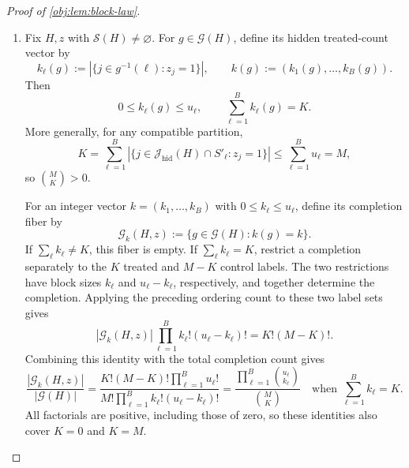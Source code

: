 \documentclass[11pt]{article}
\begin{document}
\begin{proof}[Proof of \cref{obj:lem:block-law}]
\begin{enumerate}
Define the hidden-label completion space by
\[
\mathcal G(H):=
\left\{g:\mathcal J_{\mathrm{hid}}(H)\to\{1,\ldots,B\}:
|g^{-1}(\ell)|=u_\ell\ \text{for every }\ell\right\}.
\]
Restriction to hidden labels and extension by the revealed labels give inverse maps
\[
\mathcal S(H)\longleftrightarrow\mathcal G(H),
\qquad
S'_\ell=\mathcal R_\ell(H)\cup g^{-1}(\ell).
\]
Count completions by ordering all \(M\) hidden labels and cutting the ordering into blocks of lengths \(u_1,\ldots,u_B\). Each completion arises from exactly \(\prod_\ell u_\ell!\) such orderings, because labels may be reordered within each block. Therefore
\[
|\mathcal G(H)|\prod_{\ell=1}^{B}u_\ell!=M!,
\qquad
\frac1{|\mathcal G(H)|}
=\frac{\prod_{\ell=1}^{B}u_\ell!}{M!}.
\]
The uniform compatible-partition average is consequently the same as the uniform hidden-label completion average. This identity includes \(M=0\), with \(0!=1\). For graphs with \(\mathcal S(H)=\varnothing\), the completion record measure is defined to be zero, as in the preceding step. %

\item Fix \(H,z\) with \(\mathcal S(H)\ne\varnothing\). For \(g\in\mathcal G(H)\), define its hidden treated-count vector by
\[
k_\ell(g):=|\{j\in g^{-1}(\ell):z_j=1\}|,
\qquad
k(g):=(k_1(g),\ldots,k_B(g)).
\]
Then
\[
0\le k_\ell(g)\le u_\ell,
\qquad
\sum_{\ell=1}^{B}k_\ell(g)=K.
\]
More generally, for any compatible partition,
\[
K
=\sum_{\ell=1}^{B}
|\{j\in\mathcal J_{\mathrm{hid}}(H)\cap S'_\ell:z_j=1\}|
\le\sum_{\ell=1}^{B}u_\ell=M,
\]
so \(\binom{M}{K}>0\).

For an integer vector \(k=(k_1,\ldots,k_B)\) with \(0\le k_\ell\le u_\ell\), define its completion fiber by
\[
\mathcal G_k(H,z):=\{g\in\mathcal G(H):k(g)=k\}.
\]
If \(\sum_\ell k_\ell\ne K\), this fiber is empty. If \(\sum_\ell k_\ell=K\), restrict a completion separately to the \(K\) treated and \(M-K\) control labels. The two restrictions have block sizes \(k_\ell\) and \(u_\ell-k_\ell\), respectively, and together determine the completion. Applying the preceding ordering count to these two label sets gives
\[
|\mathcal G_k(H,z)|
\prod_{\ell=1}^{B}k_\ell!(u_\ell-k_\ell)!
=K!(M-K)!.
\]
Combining this identity with the total completion count gives
\[
\frac{|\mathcal G_k(H,z)|}{|\mathcal G(H)|}
=
\frac{K!(M-K)!\prod_{\ell=1}^{B}u_\ell!}
{M!\prod_{\ell=1}^{B}k_\ell!(u_\ell-k_\ell)!}
=
\frac{\prod_{\ell=1}^{B}\binom{u_\ell}{k_\ell}}
{\binom{M}{K}}
\quad\text{when }\sum_{\ell=1}^{B}k_\ell=K.
\]
All factorials are positive, including those of zero, so these identities also cover \(K=0\) and \(K=M\).


\end{enumerate}
\end{proof}
\end{document}
